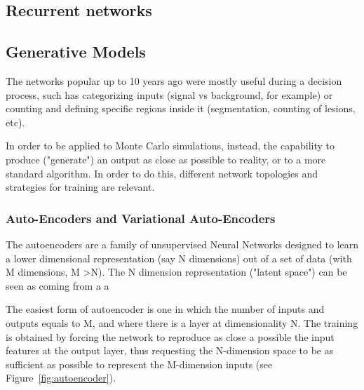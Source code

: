 \subsection{Recurrent networks}

\subsection{Generative Models}
The networks popular up to 10 years ago were mostly useful during a decision process, such has categorizing inputs (signal vs background, for example) or counting and defining specific regions inside it (segmentation, counting of lesions, etc).

In order to be applied to Monte Carlo simulations, instead, the capability to produce ("generate") an output as close as possible to reality, or to a more standard algorithm. In order to do this, different network topologies and strategies for training are relevant.


\subsubsection{Auto-Encoders and Variational Auto-Encoders}
\label{sec:unsupervised}
The autoencoders are a family of unsupervised Neural Networks designed to learn a lower dimensional representation (say N dimensions) out of a set of data (with M dimensions, M \textgreater N). The N dimension representation ("latent space") can be seen as coming from a a 

The easiest form of autoencoder is one in which the number of inputs and outputs equals to M, and where there is a layer at dimensionality N. The training is obtained by forcing the network to reproduce as close a possible the input features at the output layer, thus requesting the N-dimension space to be as sufficient as possible to represent the M-dimension inputs (see Figure~\ref{fig:autoencoder}).

